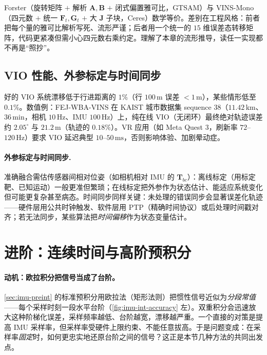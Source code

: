 \begin{insight}[两条路线殊途同归]\label{ins:two-routes}
Forster（旋转矩阵 $+$ 解析 $\mathbf A,\mathbf B$ $+$ 闭式偏置雅可比，GTSAM）与 VINS-Mono（四元数 $+$ 统一 $\mathbf F_t,\mathbf G_t$ $+$ 大 $\mathbf J$ 子块，Ceres）数学等价。差别在工程风格：前者把每个量的雅可比解析写死、流形严谨；后者用一个统一的 $15$ 维误差态转移矩阵，代码更紧凑但需小心四元数右乘约定。理解了本章的流形推导，读任一实现都不再是“照抄”。
\end{insight}

\subsection{VIO 性能、外参标定与时间同步}
\label{subsec:vio-practical}

好的 VIO 系统漂移低于行进距离的 $1\%$（行 $100\,\mathrm m$ 误差 $<1\,\mathrm m$），某些情形低至 $0.1\%$\cite{carlone2026handbook}。数值例：FEJ-WBA-VINS 在 KAIST 城市数据集 sequence 38（$11.42\,\mathrm{km}$、$36\,\mathrm{min}$，相机 $10\,\mathrm{Hz}$、IMU $100\,\mathrm{Hz}$）上，纯在线 VIO（无闭环）最终绝对轨迹误差约 $2.05^\circ$ 与 $21.2\,\mathrm m$（轨迹的 $0.18\%$）。VR 应用（如 Meta Quest 3，刷新率 $72$--$120\,\mathrm{Hz}$）要求 VIO 延迟典型 $10$--$50\,\mathrm{ms}$，否则影响体验、加剧晕动症\cite{carlone2026handbook}。

\paragraph{外参标定与时间同步.}
准确融合需估传感器间相对位姿（如相机相对 IMU 的 $\mathbf T_{bc}$）：离线标定（用标定靶、已知运动）一般更准但繁琐；在线标定把外参作为状态估计、能适应系统变化但可能更复杂甚至病态。时间同步同样关键：未处理的错误同步会显著误差化轨迹——硬件层用公共时钟触发、软件层用 PTP（精确时间协议）或后处理时间戳对齐；若无法同步，某些算法把\emph{时间偏移}作为状态变量估计\cite{carlone2026handbook}。

\section{进阶：连续时间与高阶预积分}
\label{sec:imu-advanced}

\paragraph{动机：欧拉积分把信号当成了台阶。}
\cref{sec:imu-preint} 的标准预积分用欧拉法（矩形法则）把惯性信号近似为\emph{分段常值}——每个采样时刻一段水平台阶（\cref{fig:imu-int-accuracy} 左）。双重积分会迅速放大这种阶梯化误差，采样频率越低、台阶越宽，漂移越严重。一个直接的对策是提高 IMU 采样率，但采样率受硬件上限约束、不能任意拔高。于是问题变成：在采样率\emph{固定}时，如何更忠实地还原台阶之间的信号？这正是本节几种方法的共同出发点。

